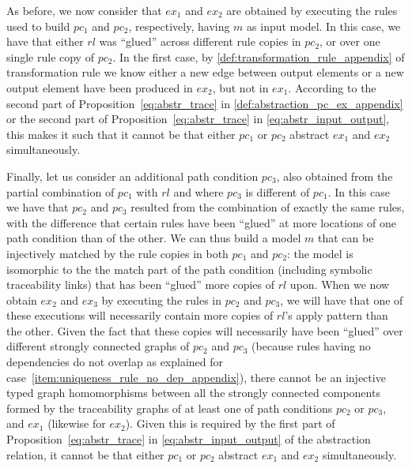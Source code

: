 \begin{ps}
As before, we now consider that $ex_1$ and $ex_2$ are obtained by executing the rules used to build $pc_1$ and $pc_2$, respectively, having $m$ as input model. In this case, we have that either $rl$ was ``glued'' across different rule copies in $pc_2$, or over one single rule copy of $pc_2$. In the first case, by \cref{def:transformation_rule_appendix} of transformation rule we know either a new edge between output elements or a new output element have been produced in $ex_2$, but not in $ex_1$. According to the second part of Proposition~\ref{eq:abstr_trace} in \cref{def:abstraction_pc_ex_appendix} or the second part of Proposition~\ref{eq:abstr_trace} in \cref{eq:abstr_input_output}, this makes it such that it cannot be that either $pc_1$ or $pc_2$ abstract $ex_1$ and $ex_2$ simultaneously.\vspace{.3cm}

Finally, let us consider an additional path condition $pc_3$, also obtained from the partial combination of $pc_1$ with $rl$ and where $pc_3$ is different of $pc_1$. In this case we have that $pc_2$ and $pc_3$ resulted from the combination of exactly the same rules, with the difference that certain rules have been ``glued'' at more locations of one path condition than of the other. We can thus build a model $m$ that can be injectively matched by the rule copies in both $pc_1$ and $pc_2$: the model is isomorphic to the the match part of the path condition (including symbolic traceability links) that has been ``glued'' more copies of $rl$ upon. When we now obtain $ex_2$ and $ex_3$ by executing the rules in $pc_2$ and $pc_3$, we will have that one of these executions will necessarily contain more copies of $rl$'s apply pattern than the other. Given the fact that these copies will necessarily have been ``glued'' over different strongly connected graphs of $pc_2$ and $pc_3$ (because rules having no dependencies do not overlap as explained for case~\ref{item:uniqueness_rule_no_dep_appendix}), there cannot be an injective typed graph homomorphisms between all the strongly connected components formed by the traceability graphs of at least one of path conditions $pc_2$ or $pc_3$, and $ex_1$ (likewise for $ex_2$). Given this is required by the first part of Proposition~\ref{eq:abstr_trace} in \cref{eq:abstr_input_output} of the abstraction relation, it cannot be that either $pc_1$ or $pc_2$ abstract $ex_1$ and $ex_2$ simultaneously.


\end{ps}

